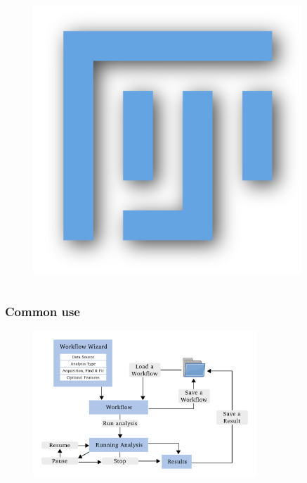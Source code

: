 \documentclass[aspectratio=169]{beamer}
\begin{document}
\begin{frame}
\begin{columns}[c]
\begin{figure}[h!]
    \centering	\includegraphics[width=0.9\textwidth]{./images/fiji.jpg} 
\end{figure} 


\end{columns}
\end{frame}


\begin{frame}
\frametitle{Common use}

\begin{figure}[h!]
    \centering	\includegraphics[width=0.75\textwidth]{./images/common_use.pdf} 
    \caption{}
    \label{fig:use}
    \end{figure} 
 
\end{frame}
\end{document}
